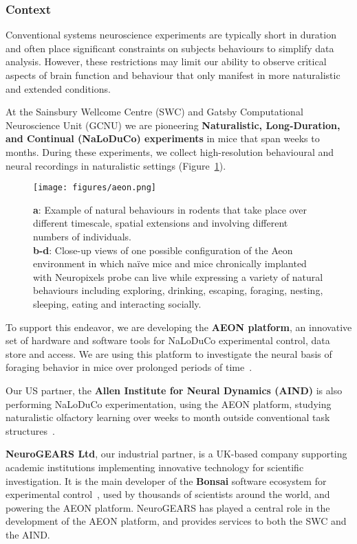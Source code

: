 \subsubsection{Context}

Conventional systems neuroscience experiments are typically short in duration
and often place significant constraints on subjects behaviours to simplify data
analysis.
%
However, these restrictions may limit our ability to observe critical
aspects of brain function and behaviour that only manifest in more naturalistic
and extended conditions.

At the Sainsbury Wellcome Centre (SWC) and Gatsby Computational Neuroscience
Unit (GCNU) we are pioneering \textbf{Naturalistic, Long-Duration, and
Continual (NaLoDuCo) experiments} in mice that span weeks to months. During
these experiments, we collect high-resolution behavioural and neural recordings
in naturalistic settings (Figure~\ref{fig:aeon}).

\begin{figure}
    \begin{center}
        \texttt{[image: figures/aeon.png]}
    \end{center}
    \caption{\textbf{a}: Example of natural behaviours in rodents that take place over
    different timescale, spatial extensions and involving different numbers of
    individuals.\\
    \textbf{b-d}: Close-up views of one possible configuration of the Aeon environment
    in which naïve mice and mice chronically implanted with Neuropixels probe
    can live while expressing a variety of natural behaviours including
    exploring, drinking, escaping, foraging, nesting, sleeping, eating and
    interacting socially.}
    \label{fig:aeon}
\end{figure}

To support this endeavor, we are developing the \textbf{AEON platform}, an
innovative set of hardware and software tools for NaLoDuCo experimental
control, data store and access. We are using this platform to investigate the
neural basis of foraging behavior in mice over prolonged periods of
time~\citep{campagnerEtAl24}.

Our US partner, the \textbf{Allen Institute for Neural Dynamics (AIND)} is also
performing NaLoDuCo experimentation, using the AEON platform, studying
naturalistic olfactory learning over weeks to month outside conventional task
structures~\citep{finkEtAl24}.

\textbf{NeuroGEARS Ltd}, our industrial partner, is a UK-based company
supporting academic institutions implementing innovative technology for
scientific investigation.
%
It is the main developer of the \textbf{Bonsai} software ecosystem for
experimental control~\citep{lopesEtAl15}, used by thousands of scientists
around the world, and powering the AEON platform.
%
NeuroGEARS  has played a central role in the development of the AEON platform,
and provides services to both the SWC and the AIND.

